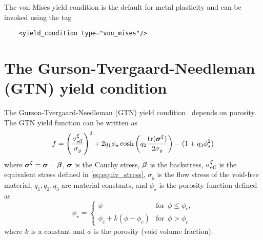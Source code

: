   The von Mises yield condition is the default for metal plasticity and
  can be invoked using the tag
  \lstset{language=XML}
  \begin{lstlisting}
    <yield_condition type="von_mises"/>
  \end{lstlisting}

\section{The Gurson-Tvergaard-Needleman (GTN) yield condition}
  The Gurson-Tvergaard-Needleman (GTN) yield 
  condition~\cite{Gurson1977,Tver1984} depends on porosity.  
  The GTN yield function can be written as
  \begin{equation}
    f = \left(\frac{\sigma^\xi_{\text{eff}}}{\sigma_y}\right)^2 +
    2 q_1 \phi_\star \cosh \left(q_2 \frac{\text{tr}(\boldsymbol{\sigma}^\xi)}{2\sigma_y}\right) -
    (1+q_3 \phi_\star^2) 
  \end{equation}
  where $\boldsymbol{\sigma}^\xi = \boldsymbol{\sigma} - \boldsymbol{\beta}$, $\boldsymbol{\sigma}$ is the Cauchy stress,
  $\boldsymbol{\beta}$ is the backstress, 
  $\sigma^\xi_{\text{eff}}$ is the equivalent stress defined in \eqref{eq:equiv_stress},
  $\sigma_y$ is the flow stress of the void-free material, 
  $q_1,q_2,q_3$ are material constants, and $\phi_\star$ is the porosity 
  function defined as
  \begin{equation}
    \phi_\star = 
    \begin{cases}
      \phi & \text{for}~~ \phi \le \phi_c,\\ 
      \phi_c + k (\phi - \phi_c) & \text{for}~~ \phi > \phi_c 
    \end{cases}
  \end{equation}
  where $k$ is a constant and $\phi$ is the porosity (void volume fraction).  

